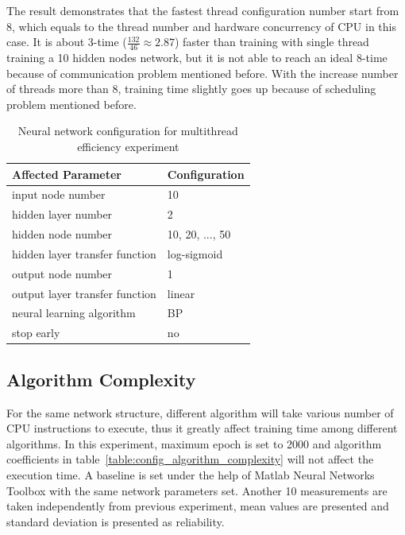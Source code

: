 \documentclass[procedia]{easychair}
\begin{document}
The result demonstrates that the fastest thread configuration number start from 8, which equals to the thread number and hardware concurrency of CPU in this case.  It is about 3-time ($\frac{132}{46} \approx 2.87$) faster than training with single thread training a 10 hidden nodes network, but it is not able to reach an ideal 8-time because of communication problem mentioned before.  With the increase number of threads more than 8, training time slightly goes up because of scheduling problem mentioned before.

\begin{table}[htp]
    \centering
    \caption{Neural network configuration for multithread efficiency experiment}
    \begin{tabular}{ l l }
        \hline \hline
        Affected Parameter & Configuration \\
        \hline
        input node number & 10 \\
        hidden layer number & 2 \\
        hidden node number & 10, 20, ..., 50 \\
        hidden layer transfer function & log-sigmoid \\
        output node number & 1 \\
        output layer transfer function & linear \\
        neural learning algorithm & BP \\
        stop early & no \\
        \hline \hline
    \end{tabular}
    \label{table:config_thread_efficiency}
\end{table}

\subsection{Algorithm Complexity}

For the same network structure, different algorithm will take various number of CPU instructions to execute, thus it greatly affect training time among different algorithms.  In this experiment, maximum epoch is set to 2000 and algorithm coefficients in table~\ref{table:config_algorithm_complexity} will not affect the execution time.  A baseline is set under the help of Matlab Neural Networks Toolbox with the same network parameters set.  Another 10 measurements are taken independently from previous experiment, mean values are presented and standard deviation is presented as reliability.
\end{document}
